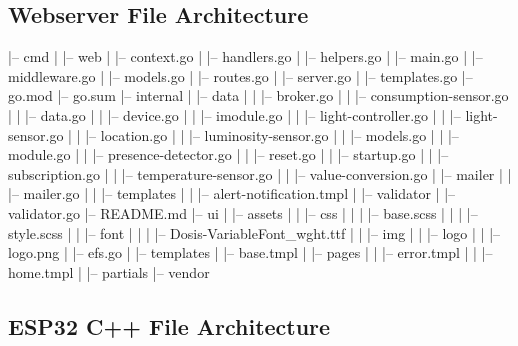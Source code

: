 \documentclass{report}
\begin{document}
        \subsection{Webserver File Architecture}\label{subsec:webserver-file-architecture}

            \begin{termbox}
            |-- cmd
            |   |-- web
            |       |-- context.go
            |       |-- handlers.go
            |       |-- helpers.go
            |       |-- main.go
            |       |-- middleware.go
            |       |-- models.go
            |       |-- routes.go
            |       |-- server.go
            |       |-- templates.go
            |-- go.mod
            |-- go.sum
            |-- internal
            |   |-- data
            |   |   |-- broker.go
            |   |   |-- consumption-sensor.go
            |   |   |-- data.go
            |   |   |-- device.go
            |   |   |-- imodule.go
            |   |   |-- light-controller.go
            |   |   |-- light-sensor.go
            |   |   |-- location.go
            |   |   |-- luminosity-sensor.go
            |   |   |-- models.go
            |   |   |-- module.go
            |   |   |-- presence-detector.go
            |   |   |-- reset.go
            |   |   |-- startup.go
            |   |   |-- subscription.go
            |   |   |-- temperature-sensor.go
            |   |   |-- value-conversion.go
            |   |-- mailer
            |   |   |-- mailer.go
            |   |   |-- templates
            |   |       |-- alert-notification.tmpl
            |   |-- validator
            |       |-- validator.go
            |-- README.md
            |-- ui
            |   |-- assets
            |   |   |-- css
            |   |   |   |-- base.scss
            |   |   |   |-- style.scss
            |   |   |-- font
            |   |   |   |-- Dosis-VariableFont_wght.ttf
            |   |   |-- img
            |   |       |-- logo
            |   |           |-- logo.png
            |   |-- efs.go
            |   |-- templates
            |       |-- base.tmpl
            |       |-- pages
            |       |   |-- error.tmpl
            |       |   |-- home.tmpl
            |       |-- partials
            |-- vendor
            \end{termbox}

        \subsection{ESP32 C++ File Architecture}\label{subsec:esp32-c++-file-architecture}
\end{document}
